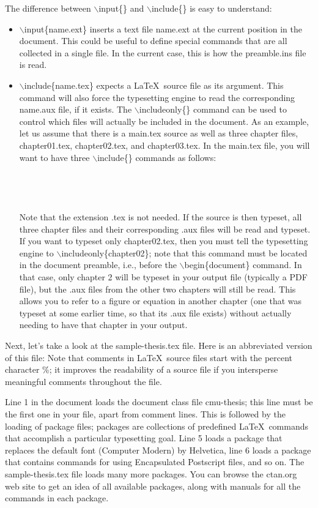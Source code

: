 \documentclass[DIV=calc, paper=letter, fontsize=11pt]{scrartcl}	 %
\newcommand{\la}[2]{\textsf{$\backslash$#1}\{#2\}}
\begin{document}
The difference between \la{input}{} and \la{include}{} is easy to understand:
\begin{itemize}
	\item \la{input}{name.ext} inserts a text file \textsf{name.ext} at the current position in the document.  This could be useful
	to define special commands that are all collected in a single file.  In the current case, this is how the \textsf{preamble.ins}
	file is read.   
	\item \la{include}{name.tex} expects a \LaTeX\ source file as its argument.  This command will also force the 
	typesetting engine to read the corresponding \textsf{name.aux} file, if it exists.  The \la{includeonly}{} command can
	be used to control which files will actually be included in the document.  As an example, let us assume that there is a 
	\textsf{main.tex} source as well as three chapter files, \textsf{chapter01.tex}, \textsf{chapter02.tex}, and \textsf{chapter03.tex}.
	In the main.tex file, you will want to have three \la{include}{} commands as follows:
	\begin{verbatim}
		
		
		
	\end{verbatim}
	Note that the extension .tex is not needed.  If the source is then typeset, all three chapter files and their corresponding .aux files
	will be read and typeset.  If you want to typeset only \textsf{chapter02.tex}, then you must tell the typesetting engine to 
	\la{includeonly}{chapter02}; note that this command must be located in the document preamble, i.e., before the \la{begin}{document}
	command.  In that case, only chapter 2 will be typeset in your output file (typically a PDF file), but the .aux files from the other two
	chapters will still be read.  This allows you to refer to a figure or equation in another chapter (one that was typeset at some earlier
	time, so that its .aux file exists) without actually needing to have that chapter in your output.
\end{itemize}

Next, let's take a look at the \textsf{sample-thesis.tex} file.  Here is an abbreviated version of this file:
Note that comments in \LaTeX\ source files start with the percent character \%; it improves the readability of a 
source file if you intersperse meaningful comments throughout the file.

Line 1 in the document loads the document class file \textsf{cmu-thesis}; this line must be the first one in your file, apart 
from comment lines.  This is followed by the loading of \textsf{package} files; packages are collections of predefined 
\LaTeX\ commands that accomplish a particular typesetting goal.  Line 5 loads a package that replaces the default font (Computer Modern)
by Helvetica, line 6 loads a package that contains commands for using Encapsulated Postscript files, and so on.
The \textsf{sample-thesis.tex} file loads many more packages.  You can browse the \textsf{ctan.org} web site
to get an idea of all available packages, along with manuals for all the commands in each package.
\end{document}

